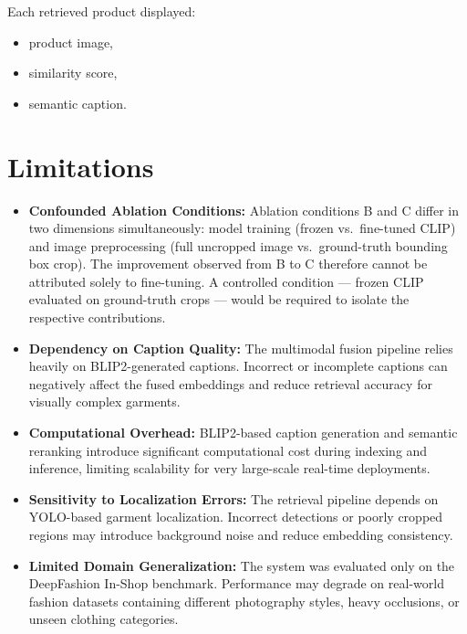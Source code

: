 \documentclass[11pt,a4paper]{article}
\begin{document}
Each retrieved product displayed:
\begin{itemize}
    \item product image,
    \item similarity score,
    \item semantic caption.
\end{itemize}

\section{Limitations}

\begin{itemize}

\item \textbf{Confounded Ablation Conditions:}
Ablation conditions B and C differ in two dimensions simultaneously: model training (frozen vs.\ fine-tuned CLIP) and image preprocessing (full uncropped image vs.\ ground-truth bounding box crop). The improvement observed from B to C therefore cannot be attributed solely to fine-tuning. A controlled condition — frozen CLIP evaluated on ground-truth crops — would be required to isolate the respective contributions.

\item \textbf{Dependency on Caption Quality:}  
The multimodal fusion pipeline relies heavily on BLIP2-generated captions. Incorrect or incomplete captions can negatively affect the fused embeddings and reduce retrieval accuracy for visually complex garments.

\item \textbf{Computational Overhead:}  
BLIP2-based caption generation and semantic reranking introduce significant computational cost during indexing and inference, limiting scalability for very large-scale real-time deployments.

\item \textbf{Sensitivity to Localization Errors:}  
The retrieval pipeline depends on YOLO-based garment localization. Incorrect detections or poorly cropped regions may introduce background noise and reduce embedding consistency.

\item \textbf{Limited Domain Generalization:}  
The system was evaluated only on the DeepFashion In-Shop benchmark. Performance may degrade on real-world fashion datasets containing different photography styles, heavy occlusions, or unseen clothing categories.

\end{itemize}
\end{document}
